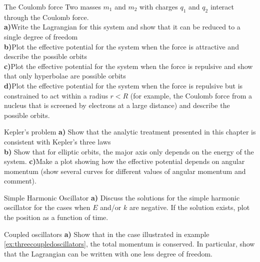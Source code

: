 \begin{problem}{The Coulomb force}
Two masses $m_1$ and $m_2$ with charges $q_1$ and $q_2$ interact through the Coulomb force.\\
\textbf{a)}Write the Lagrangian for this system and show that it can be reduced to a single degree of freedom\\
\textbf{b)}Plot the effective potential for the system when the force is attractive and describe the possible orbits\\
\textbf{c)}Plot the effective potential for the system when the force is repulsive and show that only hyperbolae are possible orbits\\
\textbf{d)}Plot the effective potential for the system when the force is repulsive but is constrained to act within a radius $r<R$ (for example, the Coulomb force from a nucleus that is screened by electrons at a large distance) and describe the possible orbits. 
\end{problem}

\begin{problem}{Kepler's problem}
\textbf{a)} Show that the analytic treatment presented in this chapter is consistent with Kepler's three laws\\
\textbf{b)} Show that for elliptic orbits, the major axis only depends on the energy of the system.
\textbf{c)}Make a plot showing how the effective potential depends on angular momentum (show several curves for different values of angular momentum and comment).
\end{problem}

\begin{problem}{Simple Harmonic Oscillator}
\textbf{a)} Discuss the solutions for the simple harmonic oscillator for the cases when $E$ and/or $k$ are negative. If the solution exists, plot the position as a function of time.
\end{problem}

\begin{problem}{Coupled oscillators}
\textbf{a)} Show that in the case illustrated in example \ref{ex:threecoupledoscillators}, the total momentum is conserved. In particular, show that the Lagrangian can be written with one less degree of freedom.
\end{problem}
